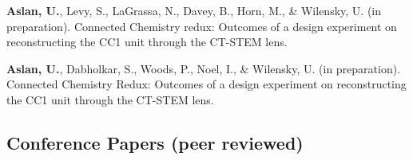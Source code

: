 \documentclass[11pt,letterpaper]{report} %
\begin{document}
    \begin{tablist}

        \item[] \tab{}\textbf{Aslan, U.}, Levy, S., LaGrassa, N., Davey, B., Horn, M., \& Wilensky, U. (in preparation). Connected Chemistry redux: Outcomes of a design experiment on reconstructing the CC1 unit through the CT-STEM lens.

        \item[] \tab{}\textbf{Aslan, U.}, Dabholkar, S., Woods, P., Noel, I., \& Wilensky, U. (in preparation). Connected Chemistry Redux: Outcomes of a design experiment on reconstructing the CC1 unit through the CT-STEM lens.

    \end{tablist}

    \subsection*{Conference Papers (peer reviewed)}
\end{document}
